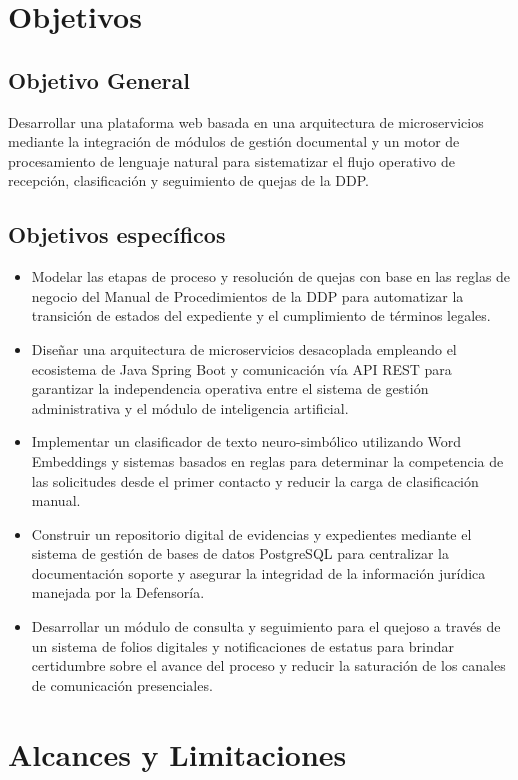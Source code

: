 \section{Objetivos}

\subsection{Objetivo General}
Desarrollar una plataforma web basada en una arquitectura de microservicios mediante la integración de módulos de gestión documental y un motor de procesamiento de lenguaje natural para sistematizar el flujo operativo de recepción, clasificación y seguimiento de quejas de la DDP.

\subsection{Objetivos específicos}
\begin{itemize}
    \item Modelar las etapas de proceso y resolución de quejas con base en las reglas de negocio del Manual de Procedimientos de la DDP para automatizar la transición de estados del expediente y el cumplimiento de términos legales.
    \item Diseñar una arquitectura de microservicios desacoplada empleando el ecosistema de Java Spring Boot y comunicación vía API REST para garantizar la independencia operativa entre el sistema de gestión administrativa y el módulo de inteligencia artificial.
    \item Implementar un clasificador de texto neuro-simbólico utilizando Word Embeddings y sistemas basados en reglas para determinar la competencia de las solicitudes desde el primer contacto y reducir la carga de clasificación manual.
    \item Construir un repositorio digital de evidencias y expedientes mediante el sistema de gestión de bases de datos PostgreSQL para centralizar la documentación soporte y asegurar la integridad de la información jurídica manejada por la Defensoría.
    \item Desarrollar un módulo de consulta y seguimiento para el quejoso a través de un sistema de folios digitales y notificaciones de estatus para brindar certidumbre sobre el avance del proceso y reducir la saturación de los canales de comunicación presenciales.
\end{itemize}

\section{Alcances y Limitaciones}

